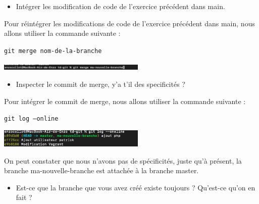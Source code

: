 \documentclass[12pt]{article}
\begin{document}
\begin{itemize}
  \item Intégrer les modification de code de l'exercice précédent dans main.
\end{itemize}

\vspace{0.3cm}

Pour réintégrer les modifications de code de l'exercice précédent dans main, nous allons utiliser la commande suivante :

\texttt{git merge nom-de-la-branche}

\vspace{0.3cm}

\begin{center}
  \includegraphics[width=7cm]{Images-TD-Git/Image-TD-Git-3/git-merge.png}
\end{center}

\vspace{0.3cm}

\begin{itemize}
  \item Inspecter le commit de merge, y'a t'il des specificités ?
\end{itemize}

\vspace{0.3cm}

Pour intégrer le commit de merge, nous allons utiliser la commande suivante :

\texttt{git log --online}

\vspace{0.3cm}

\begin{center}
  \includegraphics[width=7cm]{Images-TD-Git/Image-TD-Git-3/git-log.png}
\end{center}

\vspace{0.3cm}

On peut constater que nous n'avons pas de spécificités, juste qu'à présent, la branche ma-nouvelle-branche est attachée à la branche master.

\vspace{0.3cm}

\begin{itemize}
  \item Est-ce que la branche que vous avez créé existe toujours ? Qu'est-ce qu'on en fait ?
\end{itemize}
\end{document}
